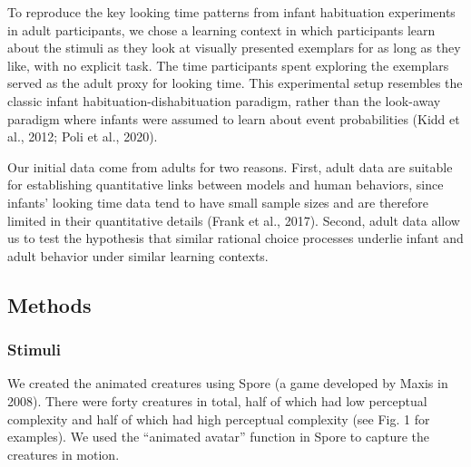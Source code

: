\documentclass[
  man,floatsintext]{apa6}
\begin{document}
To reproduce the key looking time patterns from infant habituation experiments in adult participants, we chose a learning context in which participants learn about the stimuli as they look at visually presented exemplars for as long as they like, with no explicit task. The time participants spent exploring the exemplars served as the adult proxy for looking time. This experimental setup resembles the classic infant habituation-dishabituation paradigm, rather than the look-away paradigm where infants were assumed to learn about event probabilities (Kidd et al., 2012; Poli et al., 2020).

Our initial data come from adults for two reasons. First, adult data are suitable for establishing quantitative links between models and human behaviors, since infants' looking time data tend to have small sample sizes and are therefore limited in their quantitative details (Frank et al., 2017). Second, adult data allow us to test the hypothesis that similar rational choice processes underlie infant and adult behavior under similar learning contexts.

\hypertarget{methods}{%
\subsection{Methods}\label{methods}}

\hypertarget{stimuli}{%
\subsubsection{Stimuli}\label{stimuli}}

We created the animated creatures using Spore (a game developed by Maxis in 2008). There were forty creatures in total, half of which had low perceptual complexity and half of which had high perceptual complexity (see Fig. 1 for examples). We used the ``animated avatar'' function in Spore to capture the creatures in motion.
\end{document}
